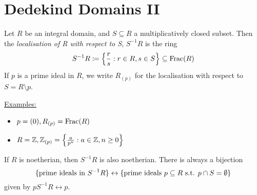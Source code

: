 \documentclass[10pt,a4paper]{article}
\begin{document}
\section{Dedekind Domains II}
Let $R$ be an integral domain, and $S \subseteq R$ a multiplicatively closed subset. Then the \emph{localisation of R with respect to S}, $S^{-1}R$ is the ring
\[S^{-1}R \coloneqq \left\{\frac{r}{s} : r \in R, s \in S\right\}\subseteq \operatorname{Frac}(R)\]
If $p$ is a prime ideal in $R$, we write $R_{(p)}$ for the localisation with respect to $S = R\setminus p$.

\underline{Examples:}
\begin{itemize}
  \item $p = (0), R_{(p)} = \operatorname{Frac}(R)$
  \item $R = \mathbb{Z}, \mathbb{Z}_{(p)} = \left\{\frac{a}{p^n}:a \in \mathbb{Z}, n \geq 0 \right\}$
\end{itemize}
If $R$ is noetherian, then $S^{-1}R$ is also noetherian. There is always a bijection
\[\{\text{prime ideals in }S^{-1}R\} \leftrightarrow \{\text{prime ideals }p\subseteq R\text{ s.t. } p\cap S =\emptyset\}\]
given by $pS^{-1}R \leftrightarrow p$.
\end{document}
